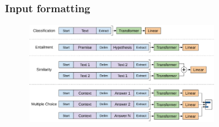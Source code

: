 \documentclass[9pt]{beamer}
\begin{document}
\begin{frame}
  \frametitle{Input formatting}

  \begin{figure}
    \includegraphics[width = 8cm]{images/input_formatting.png}
  \end{figure}




\end{frame}


\end{document}
